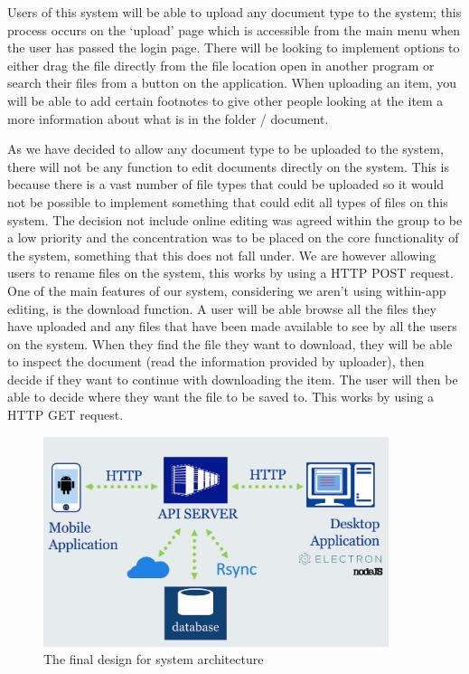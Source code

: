 \documentclass[11pt]{article}
\begin{document}
Users of this system will be able to upload any document type to the system; this process occurs on the ‘upload’ page which is accessible from the main menu when the user has passed the login page. There will be looking to implement options to either drag the file directly from the file location open in another program or search their files from a button on the application. When uploading an item, you will be able to add certain footnotes to give other people looking at the item a more information about what is in the folder / document. 

As we have decided to allow any document type to be uploaded to the system, there will not be any function to edit documents directly on the system. This is because there is a vast number of file types that could be uploaded so it would not be possible to implement something that could edit all types of files on this system. The decision not include online editing was agreed within the group to be a low priority and the concentration was to be placed on the core functionality of the system, something that this does not fall under. We are however allowing users to rename files on the system, this works by using a HTTP POST request.
One of the main features of our system, considering we aren’t using within-app editing, is the download function. A user will be able browse all the files they have uploaded and any files that have been made available to see by all the users on the system. When they find the file they want to download, they will be able to inspect the document (read the information provided by uploader), then decide if they want to continue with downloading the item. The user will then be able to decide where they want the file to be saved to. This works by using a HTTP GET request.


\begin{figure} [h!]
\caption{The final design for system architecture}
\centering
\includegraphics[width=0.9\textwidth]{Group_Project/architecture.png}
\end{figure}
\end{document}
